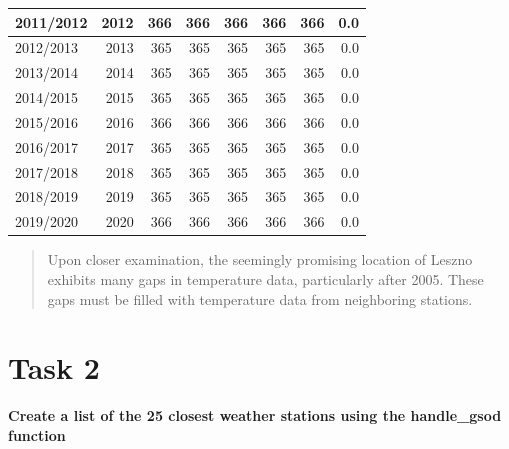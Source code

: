\documentclass[
]{book}
\newenvironment{Shaded}{\begin{snugshade}}{\end{snugshade}}
\newcommand{\CommentTok}[1]{\textcolor[rgb]{0.56,0.35,0.01}{\textit{#1}}}
\newcommand{\DataTypeTok}[1]{\textcolor[rgb]{0.13,0.29,0.53}{#1}}
\newcommand{\DecValTok}[1]{\textcolor[rgb]{0.00,0.00,0.81}{#1}}
\newcommand{\KeywordTok}[1]{\textcolor[rgb]{0.13,0.29,0.53}{\textbf{#1}}}
\newcommand{\NormalTok}[1]{#1}
\newcommand{\OperatorTok}[1]{\textcolor[rgb]{0.81,0.36,0.00}{\textbf{#1}}}
\newcommand{\StringTok}[1]{\textcolor[rgb]{0.31,0.60,0.02}{#1}}
\begin{document}
\begin{table}
\begin{tabular}[t]{l|r|r|r|r|r|r|r}
\hline
2011/2012 & 2012 & 366 & 366 & 366 & 366 & 366 & 0.0\\
\hline
2012/2013 & 2013 & 365 & 365 & 365 & 365 & 365 & 0.0\\
\hline
2013/2014 & 2014 & 365 & 365 & 365 & 365 & 365 & 0.0\\
\hline
2014/2015 & 2015 & 365 & 365 & 365 & 365 & 365 & 0.0\\
\hline
2015/2016 & 2016 & 366 & 366 & 366 & 366 & 366 & 0.0\\
\hline
2016/2017 & 2017 & 365 & 365 & 365 & 365 & 365 & 0.0\\
\hline
2017/2018 & 2018 & 365 & 365 & 365 & 365 & 365 & 0.0\\
\hline
2018/2019 & 2019 & 365 & 365 & 365 & 365 & 365 & 0.0\\
\hline
2019/2020 & 2020 & 366 & 366 & 366 & 366 & 366 & 0.0\\
\hline
\end{tabular}
\end{table}

\begin{quote}
Upon closer examination, the seemingly promising location of Leszno exhibits many gaps in temperature data, particularly after 2005. These gaps must be filled with temperature data from neighboring stations.
\end{quote}

\hypertarget{task-2-5}{%
\section{Task 2}\label{task-2-5}}

\textbf{Create a list of the 25 closest weather stations using the handle\_gsod function}

\begin{Shaded}
\end{Shaded}
\end{document}
